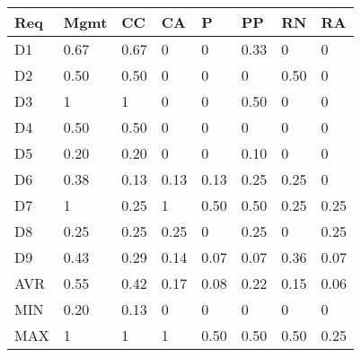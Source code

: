 \begin{tabularx}{\columnwidth}{|l|X|X|X|X|X|X|X|}
\hline
Req	& Mgmt & CC   & CA   & P    & PP   & RN	  & RA   \\\hline
D1	& 0.67 & 0.67 & 0    & 0    & 0.33 & 0    & 0    \\\hline
D2	& 0.50 & 0.50 & 0    & 0    & 0    & 0.50 & 0    \\\hline
D3	& 1    & 1    & 0    & 0    & 0.50 & 0    & 0    \\\hline
D4	& 0.50 & 0.50 & 0    & 0    & 0    & 0    & 0    \\\hline
D5	& 0.20 & 0.20 & 0    & 0    & 0.10 & 0    & 0    \\\hline
D6	& 0.38 & 0.13 & 0.13 & 0.13 & 0.25 & 0.25 & 0    \\\hline
D7	& 1    & 0.25 & 1    & 0.50 & 0.50 & 0.25 & 0.25 \\\hline
D8	& 0.25 & 0.25 & 0.25 & 0    & 0.25 & 0    & 0.25 \\\hline
D9	& 0.43 & 0.29 & 0.14 & 0.07 & 0.07 & 0.36 & 0.07 \\\hline
AVR	& 0.55 & 0.42 & 0.17 & 0.08 & 0.22 & 0.15 & 0.06 \\\hline
MIN	& 0.20 & 0.13 & 0    & 0    & 0    & 0    & 0    \\\hline
MAX	& 1    & 1    & 1    & 0.50 & 0.50 & 0.50 & 0.25 \\\hline
\end{tabularx}
